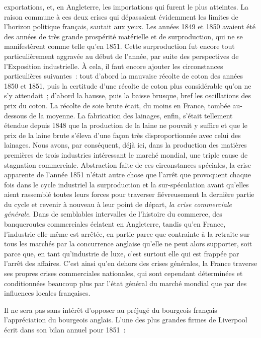 \documentclass[french,twoside]{book} %
\begin{document}
exportations, et, en Angleterre, les importations qui furent le plus atteintes. La raison commune à ces deux crises qui dépassaient évidemment les limites de l’horizon politique français, sautait aux yeux. Les années 1849 et 1850 avaient été des années de très grande prospérité matérielle et de surproduction, qui ne se manifestèrent comme telle qu’en 1851. Cette surproduction fut encore tout particulièrement aggravée au début de l’année, par suite des perspectives de l’Exposition industrielle. À cela, il faut encore ajouter les circonstances particulières suivantes : tout d’abord la mauvaise récolte de coton des années 1850 et 1851, puis la certitude d’une récolte de coton plus considérable qu’on ne s’y attendait ; d’abord la hausse, puis la baisse brusque, bref les oscillations des prix du coton. La récolte de soie brute était, du moins en France, tombée au-dessous de la moyenne. La fabrication des lainages, enfin, s’était tellement étendue depuis 1848 que la production de la laine ne pouvait y suffire et que le prix de la laine brute s’éleva d’une façon très disproportionnée avec celui des lainages. Nous avons, par conséquent, déjà ici, dans la production des matières premières de trois industries intéressant le marché mondial, une triple cause de stagnation commerciale. Abstraction faite de ces circonstances spéciales, la crise apparente de l’année 1851 n’était autre chose que l’arrêt que provoquent chaque fois dans le cycle industriel la surproduction et la sur-spéculation avant qu’elles aient rassemblé toutes leurs forces pour traverser fiévreusement la dernière partie du cycle et revenir à nouveau à leur point de départ, \emph{la crise commerciale générale}. Dans de semblables intervalles de l’histoire du commerce, des banqueroutes commerciales éclatent en Angleterre, tandis qu’en France, l’industrie elle-même est arrêtée, en partie parce que contrainte à la retraite sur tous les marchés par la concurrence anglaise qu’elle ne peut alors supporter, soit parce que, en tant qu’industrie de luxe, c’est surtout elle qui est frappée par l’arrêt des affaires. C’est ainsi qu’en dehors des crises générales, la France traverse ses propres crises commerciales nationales, qui sont cependant déterminées et conditionnées beaucoup plus par l’état général du marché mondial que par des influences locales françaises.\par
Il ne sera pas sans intérêt d’opposer au préjugé du bourgeois français l’appréciation du bourgeois anglais. L’une des plus grandes firmes de Liverpool écrit dans son bilan annuel pour 1851 :\par
\end{document}
